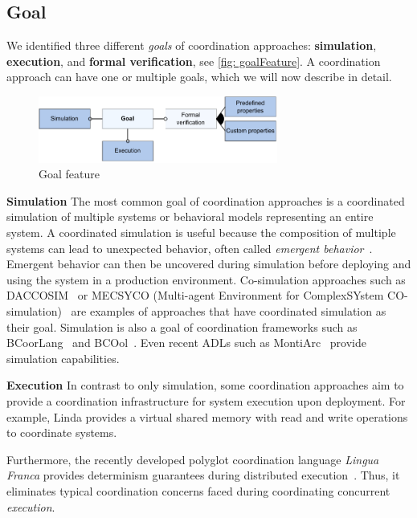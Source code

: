 \documentclass[runningheads]{llncs}
\newcommand{\feature}[1]{\textbf{#1}}
\begin{document}
\subsection{Goal} %
We identified three different \textit{goals} of coordination approaches: \textbf{simulation}, \textbf{execution}, and \textbf{formal verification}, see \autoref{fig: goalFeature}.
A coordination approach can have one or multiple goals, which we will now describe in detail.

\begin{figure}[ht]
	\centering
	\includegraphics[width=0.7\textwidth]{images/goal_feature}
	\caption{Goal feature}
	\label{fig: goalFeature}
\end{figure}

\feature{Simulation} The most common goal of coordination approaches is a coordinated simulation of multiple systems or behavioral models representing an entire system.
A coordinated simulation is useful because the composition of multiple systems can lead to unexpected behavior, often called \textit{emergent behavior}~\cite{ekerTamingHeterogeneityPtolemy2003}.
Emergent behavior can then be uncovered during simulation before deploying and using the system in a production environment.
Co-simulation approaches such as DACCOSIM~\cite{galtierFMIBasedDistributedMultisimulation2015,dadSynthesisFeedbackDistribution2021} or MECSYCO (Multi-agent Environment for ComplexSYstem CO-simulation)~\cite{camusHybridCosimulationFMUs2016,camusCosimulationCyberphysicalSystems2018} are examples of approaches that have coordinated simulation as their goal.
Simulation is also a goal of coordination frameworks such as BCoorLang~\cite{krauterBehavioralConsistencyMultimodeling2023} and BCOol~\cite{varalarsenBehavioralCoordinationOperator2015}.
Even recent ADLs such as MontiArc~\cite{haberMontiArcArchitecturalModeling2014} provide simulation capabilities.

\feature{Execution} In contrast to only simulation, some coordination approaches aim to provide a coordination infrastructure for system execution upon deployment.
For example, Linda provides a virtual shared memory with read and write operations to coordinate systems.

Furthermore, the recently developed polyglot coordination language \textit{Lingua Franca} provides determinism guarantees during distributed execution~\cite{lohstrohLinguaFrancaDeterministic2021}.
Thus, it eliminates typical coordination concerns faced during coordinating concurrent \textit{execution}.
\end{document}
